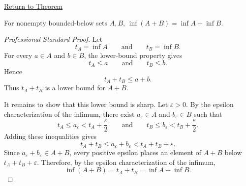\newpage
{}
\label{prf:infimum-sum-set}

\begin{remark*}[Return]
\hyperref[thm:infimum-sum-set]{Return to Theorem}
\end{remark*}

\begin{theorem*}
For nonempty bounded-below sets $A,B$, $\inf(A+B)=\inf A+\inf B$.
\end{theorem*}

\begin{proof}[Professional Standard Proof]
\LRAProofBodyStart
Let
\[
t_A=\inf A
\qquad\text{and}\qquad
t_B=\inf B.
\]
For every $a\in A$ and $b\in B$, the lower-bound property gives
\[
t_A\le a
\qquad\text{and}\qquad
t_B\le b.
\]
Hence
\[
t_A+t_B\le a+b.
\]
Thus $t_A+t_B$ is a lower bound for $A+B$.

It remains to show that this lower bound is sharp. Let $\varepsilon>0$. By
the epsilon characterization of the infimum, there exist
$a_\varepsilon\in A$ and $b_\varepsilon\in B$ such that
\[
t_A\le a_\varepsilon<t_A+\frac{\varepsilon}{2}
\qquad\text{and}\qquad
t_B\le b_\varepsilon<t_B+\frac{\varepsilon}{2}.
\]
Adding these inequalities gives
\[
t_A+t_B
\le
a_\varepsilon+b_\varepsilon
<
t_A+t_B+\varepsilon.
\]
Since $a_\varepsilon+b_\varepsilon\in A+B$, every positive epsilon places an
element of $A+B$ below $t_A+t_B+\varepsilon$. Therefore, by the epsilon
characterization of the infimum,
\[
\inf(A+B)=t_A+t_B=\inf A+\inf B.
\]
\end{proof}

